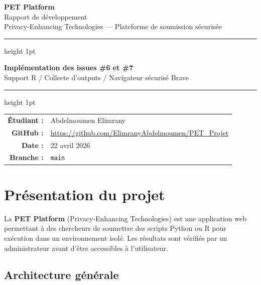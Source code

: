 \documentclass[12pt,a4paper]{article}
\begin{document}
\begin{titlepage}
  \centering
  \vspace*{2cm}

  {\Huge\bfseries\color{petblue} PET Platform}\\[0.5cm]
  {\Large Rapport de développement}\\[0.3cm]
  {\large Privacy-Enhancing Technologies — Plateforme de soumission sécurisée}

  \vspace{1.5cm}
  \hrule height 1pt
  \vspace{0.5cm}

  {\large\bfseries Implémentation des issues \#6 et \#7}\\[0.3cm]
  {\normalsize Support R / Collecte d'outputs / Navigateur sécurisé Brave}

  \vspace{0.5cm}
  \hrule height 1pt

  \vfill

  \begin{tabular}{rl}
    \textbf{Étudiant :} & Abdelmoumen Elimrany \\
    \textbf{GitHub :}   & \url{https://github.com/ElimranyAbdelmoumen/PET_Projet} \\
    \textbf{Date :}     & 22 avril 2026 \\
    \textbf{Branche :}  & \texttt{main} \\
  \end{tabular}

  \vspace{2cm}
\end{titlepage}

\tableofcontents
\newpage

\section{Présentation du projet}

La \textbf{PET Platform} (Privacy-Enhancing Technologies) est une application web permettant à des chercheurs de soumettre des scripts Python ou R pour exécution dans un environnement isolé. Les résultats sont vérifiés par un administrateur avant d'être accessibles à l'utilisateur.

\subsection{Architecture générale}
\end{document}
